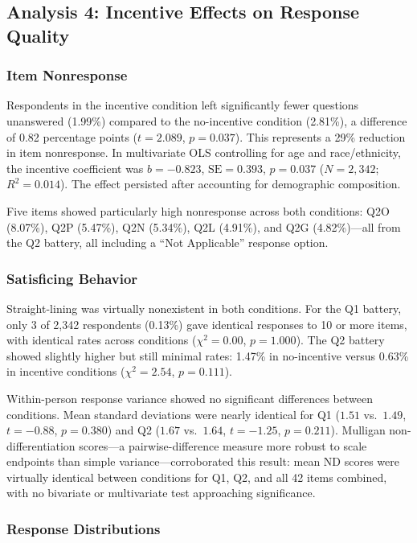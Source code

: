\subsection{Analysis 4: Incentive Effects on Response Quality}

\subsubsection{Item Nonresponse}

Respondents in the incentive condition left significantly fewer questions unanswered
(1.99\%) compared to the no-incentive condition (2.81\%), a difference of 0.82
percentage points ($t = 2.089$, $p = 0.037$). This represents a 29\% reduction in item
nonresponse. In multivariate OLS controlling for age and race/ethnicity, the incentive
coefficient was $b = -0.823$, $\text{SE} = 0.393$, $p = 0.037$ ($N = 2{,}342$;
$R^2 = 0.014$). The effect persisted after accounting for demographic composition.

Five items showed particularly high nonresponse across both conditions: Q2O (8.07\%),
Q2P (5.47\%), Q2N (5.34\%), Q2L (4.91\%), and Q2G (4.82\%)---all from the Q2 battery,
all including a ``Not Applicable'' response option.

\subsubsection{Satisficing Behavior}

Straight-lining was virtually nonexistent in both conditions. For the Q1 battery, only 3
of 2,342 respondents (0.13\%) gave identical responses to 10 or more items, with
identical rates across conditions ($\chi^2 = 0.00$, $p = 1.000$). The Q2 battery showed
slightly higher but still minimal rates: 1.47\% in no-incentive versus 0.63\% in
incentive conditions ($\chi^2 = 2.54$, $p = 0.111$).

Within-person response variance showed no significant differences between conditions.
Mean standard deviations were nearly identical for Q1 ($1.51$ vs.\ $1.49$,
$t = -0.88$, $p = 0.380$) and Q2 ($1.67$ vs.\ $1.64$, $t = -1.25$, $p = 0.211$).
Mulligan non-differentiation scores---a pairwise-difference measure more robust to scale
endpoints than simple variance---corroborated this result: mean ND scores were virtually
identical between conditions for Q1, Q2, and all 42 items combined, with no bivariate or
multivariate test approaching significance.

\subsubsection{Response Distributions}

